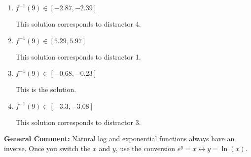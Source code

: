 \documentclass{extbook}[14pt]
\begin{document}
\begin{enumerate}
{\begin{enumerate}[label=\Alph*.]
 This solution corresponds to distractor 2.
\item \( f^{-1}(9) \in [-2.87, -2.39] \)

 This solution corresponds to distractor 4.
\item \( f^{-1}(9) \in [5.29, 5.97] \)

 This solution corresponds to distractor 1.
\item \( f^{-1}(9) \in [-0.68, -0.23] \)

 This is the solution.
\item \( f^{-1}(9) \in [-3.3, -3.08] \)

 This solution corresponds to distractor 3.
\end{enumerate}

\textbf{General Comment:} Natural log and exponential functions always have an inverse. Once you switch the $x$ and $y$, use the conversion $ e^y = x \leftrightarrow y=\ln(x)$.
}
\end{enumerate}
\end{document}
